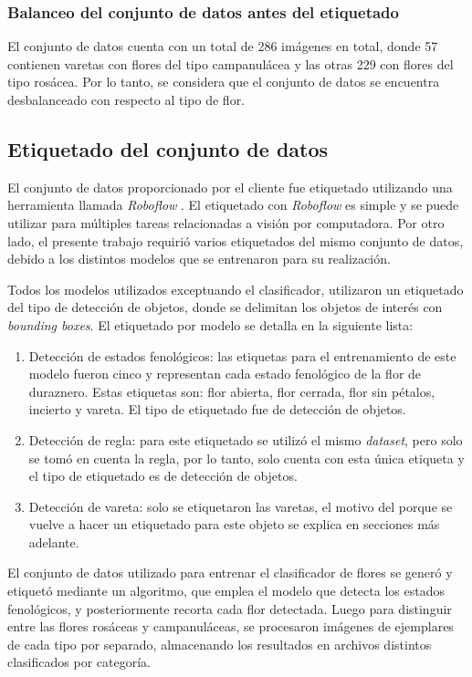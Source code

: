 \subsubsection{Balanceo del conjunto de datos antes del etiquetado}

El conjunto de datos cuenta con un total de 286 imágenes en total, donde 57 contienen varetas con flores del tipo campanulácea y las otras 229 con flores del tipo rosácea. Por lo tanto, se considera que el conjunto de datos se encuentra desbalanceado con respecto al tipo de flor. 

\subsection{Etiquetado del conjunto de datos}

El conjunto de datos proporcionado por el cliente fue etiquetado utilizando una herramienta llamada \textit{Roboflow} \cite{WEBSITE:9}. El etiquetado con \textit{Roboflow} es simple y se puede utilizar para múltiples tareas relacionadas a visión por computadora. Por otro lado, el presente trabajo requirió varios etiquetados del mismo conjunto de datos, debido a los distintos modelos que se entrenaron para su realización.

Todos los modelos utilizados exceptuando el clasificador, utilizaron un etiquetado del tipo de detección de objetos, donde se delimitan los objetos de interés con \textit{bounding boxes}. El etiquetado por modelo se detalla en la siguiente lista:

\begin{enumerate}
	\item Detección de estados fenológicos: las etiquetas para el entrenamiento de este modelo fueron cinco y representan cada estado fenológico de la flor de duraznero. Estas etiquetas son: flor abierta, flor cerrada, flor sin pétalos, incierto y vareta. El tipo de etiquetado fue de detección de objetos.
	\item Detección de regla: para este etiquetado se utilizó el mismo \textit{dataset}, pero solo se tomó en cuenta la regla, por lo tanto, solo cuenta con esta única etiqueta y el tipo de etiquetado es de detección de objetos.
	\item Detección de vareta: solo se etiquetaron las varetas, el motivo del porque se vuelve a hacer un etiquetado para este objeto se explica en secciones más adelante.
\end{enumerate}

El conjunto de datos utilizado para entrenar el clasificador de flores se generó y etiquetó mediante un algoritmo, que emplea el modelo que detecta los estados fenológicos, y posteriormente recorta cada flor detectada. Luego para distinguir entre las flores rosáceas y campanuláceas, se procesaron imágenes de ejemplares de cada tipo por separado, almacenando los resultados en archivos distintos clasificados por categoría.

